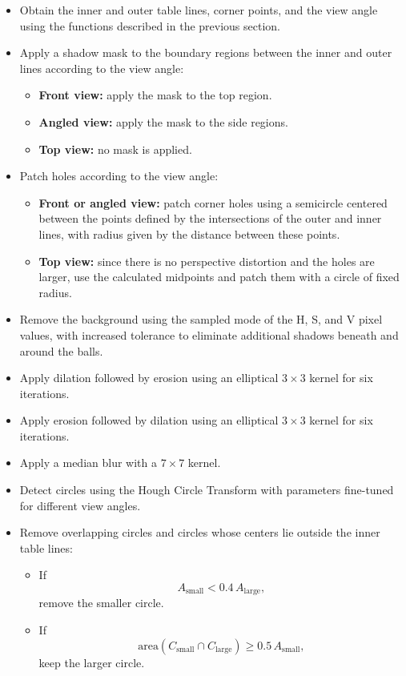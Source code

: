 \begin{itemize}
    \item Obtain the inner and outer table lines, corner points, and the view angle using the functions described in the previous section.
    
    \item Apply a shadow mask to the boundary regions between the inner and outer lines according to the view angle:
    \begin{itemize}
        \item \textbf{Front view:} apply the mask to the top region.
        \item \textbf{Angled view:} apply the mask to the side regions.
        \item \textbf{Top view:} no mask is applied.
    \end{itemize}
    
    \item Patch holes according to the view angle:
    \begin{itemize}
        \item \textbf{Front or angled view:} patch corner holes using a semicircle centered between the points defined by the intersections of the outer and inner lines, with radius given by the distance between these points.
        \item \textbf{Top view:} since there is no perspective distortion and the holes are larger, use the calculated midpoints and patch them with a circle of fixed radius.
    \end{itemize}
    
    \item Remove the background using the sampled mode of the H, S, and V pixel values, with increased tolerance to eliminate additional shadows beneath and around the balls.
    
    \item Apply dilation followed by erosion using an elliptical $3\times3$ kernel for six iterations.
    
    \item Apply erosion followed by dilation using an elliptical $3\times3$ kernel for six iterations.
    
    \item Apply a median blur with a $7\times7$ kernel.
    
    \item Detect circles using the Hough Circle Transform with parameters fine-tuned for different view angles.
    
    \item Remove overlapping circles and circles whose centers lie outside the inner table lines:
    \begin{itemize}
        \item If
        \[
        A_{\text{small}} < 0.4 \, A_{\text{large}},
        \]
        remove the smaller circle.
        
        \item If
        \[
        \mathrm{area}(C_{\text{small}} \cap C_{\text{large}}) \geq 0.5 \, A_{\text{small}},
        \]
        keep the larger circle.
    \end{itemize}
\end{itemize}


